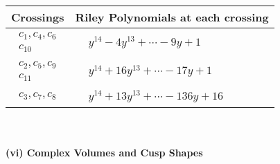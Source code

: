 \documentclass[1p]{elsarticle_modified}
\theoremstyle{definition}
\begin{document}
\begin{tabular}{m{50pt}|m{274pt}}
Crossings & \hspace{64pt}Riley Polynomials at each crossing \\
\hline $$\begin{aligned}c_{1},c_{4},c_{6}\\c_{10}\end{aligned}$$&$\begin{aligned}
&y^{14}-4 y^{13}+\cdots-9 y+1
\end{aligned}$\\
\hline $$\begin{aligned}c_{2},c_{5},c_{9}\\c_{11}\end{aligned}$$&$\begin{aligned}
&y^{14}+16 y^{13}+\cdots-17 y+1
\end{aligned}$\\
\hline $$\begin{aligned}c_{3},c_{7},c_{8}\end{aligned}$$&$\begin{aligned}
&y^{14}+13 y^{13}+\cdots-136 y+16
\end{aligned}$\\
\hline
\end{tabular}\\~\\
\newpage\flushleft \textbf{(vi) Complex Volumes and Cusp Shapes}
\end{document}
